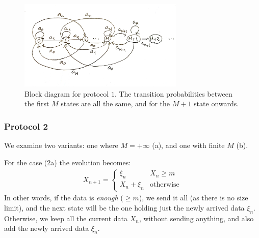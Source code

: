 \documentclass[../template.tex]{subfiles}
\begin{document}
\begin{figure}[htp]
    \centering
    \includegraphics[width=0.7\textwidth]{block1.jpeg}
    \caption{Block diagram for protocol $1$. The transition probabilities between the first $M$ states are all the same, and  for the $M+1$ state onwards.\label{fig:block-diagram1}} 
\end{figure}

\subsubsection{Protocol 2}
We examine two variants: one where $M = +\infty$ (a), and one with finite $M$ (b).

For the case (2a) the evolution becomes:
\begin{align*}
    X_{n+1} = \begin{cases}
        \xi_n & X_n \geq m\\
        X_n + \xi_n & \text{otherwise}
    \end{cases}
\end{align*}
In other words, if the data is \textit{enough} ($\geq m$), we send it all (as there is no size limit), and the next state will be the one holding just the newly arrived data $\xi_n$. Otherwise, we keep all the current data $X_n$, without sending anything, and also add the newly arrived data $\xi_n$.

\medskip
\end{document}
